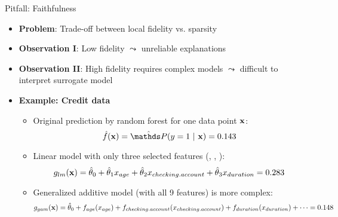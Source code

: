 \documentclass[11pt,compress,t,notes=noshow, aspectratio=169, xcolor=table]{beamer}
\newcommand{\thetah}{\hat{\theta}}
\begin{document}
\begin{frame}[c]{Pitfall: Faithfulness}
\begin{itemize}
	\item \textbf{Problem}: Trade-off between local fidelity vs. sparsity
	\item \textbf{Observation I}: Low fidelity $\leadsto$ unreliable explanations
	\item \textbf{Observation II}: High fidelity requires complex models $\leadsto$ difficult to interpret surrogate model %
	\pause
	\item \textbf{Example: Credit data} 
	\begin{itemize}
	\itemsep0em
	    \item Original prediction by random forest for one data point $\mathbf{x}$: 
	    $$\fh(\xv) = \hat{\P}(y = 1 ~|~ \xv) = 0.143$$
	    \item %
	    Linear model with only three selected features (, , ):
	    $$g_{lm}(\xv) = \thetah_0 + \thetah_1 x_{age} + \thetah_2 x_{checking.account} + \thetah_3 x_{duration} = 0.283$$
	    \item Generalized additive model (with all 9 features) is more complex:
    $$%
    g_{gam}(\xv) = \thetah_0 + f_{age}(x_{age}) + f_{checking.account}(x_{checking.account}) + f_{duration}(x_{duration}) +  \dots %
    = 0.148$$
	\end{itemize}
\end{itemize}

\end{frame}
\end{document}

